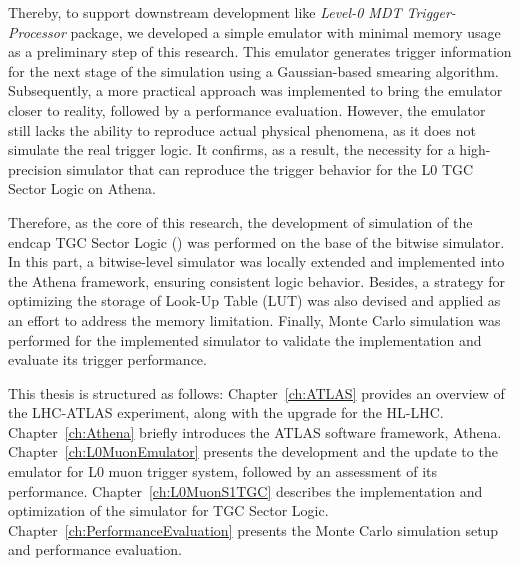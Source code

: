 Thereby, to support downstream development like \textit{Level-0 MDT Trigger-Processor} package, we developed a simple emulator with minimal memory usage as a preliminary step of this research. This emulator generates trigger information for the next stage of the simulation using a Gaussian-based smearing algorithm. Subsequently, a more practical approach was implemented to bring the emulator closer to reality, followed by a performance evaluation. However, the emulator still lacks the ability to reproduce actual physical phenomena, as it does not simulate the real trigger logic. It confirms, as a result, the necessity for a high-precision simulator that can reproduce the trigger behavior for the L0 TGC Sector Logic on Athena.

Therefore, as the core of this research, the development of simulation of the endcap TGC Sector Logic (\SL) was performed on the base of the bitwise simulator. In this part, a bitwise-level simulator was locally extended and implemented into the Athena framework, ensuring consistent logic behavior. Besides, a strategy for optimizing the storage of Look-Up Table (LUT) was also devised and applied as an effort to address the memory limitation. Finally, Monte Carlo simulation was performed for the implemented simulator to validate the implementation and evaluate its trigger performance.

This thesis is structured as follows: Chapter~\ref{ch:ATLAS} provides an overview of the LHC-ATLAS experiment, along with the upgrade for the HL-LHC. Chapter~\ref{ch:Athena} briefly introduces the ATLAS software framework, Athena. Chapter~\ref{ch:L0MuonEmulator} presents the development and the update to the emulator for L0 muon trigger system, followed by an assessment of its performance. Chapter~\ref{ch:L0MuonS1TGC} describes the implementation and optimization of the simulator for TGC Sector Logic. Chapter~\ref{ch:PerformanceEvaluation} presents the Monte Carlo simulation setup and performance evaluation.